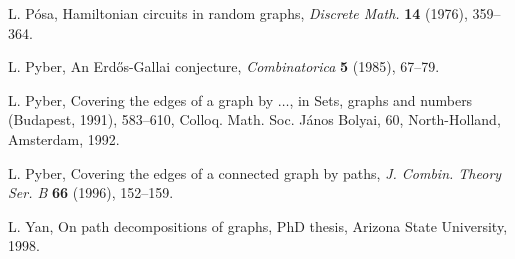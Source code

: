 \documentclass[11pt]{article}
\begin{document}
\begin{thebibliography}{}
{L. P\'osa,} {Hamiltonian circuits in random graphs,} {\it Discrete Math.} {\bf 14} (1976), 359--364.

L. Pyber, An Erd\H{o}s-Gallai conjecture, {\it Combinatorica } {\bf 5} (1985), 67--79.

L. Pyber, Covering the edges of a graph by $\ldots$, in Sets, graphs and numbers (Budapest, 1991), 583--610, Colloq. Math. Soc. J\'anos Bolyai, 60, North-Holland, Amsterdam, 1992.

{L. Pyber,} {Covering the edges of a connected graph by paths,} {\it J. Combin. Theory Ser. B} {\bf 66} (1996), 152--159.

{L. Yan,} {On path decompositions of graphs,} {PhD thesis,} {Arizona State University,} 1998.

\end{thebibliography}
\end{document}

